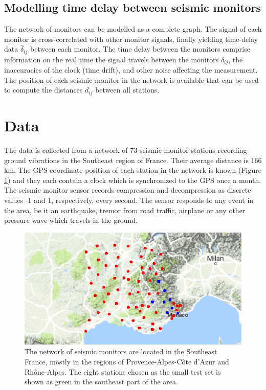 \documentclass[12pt,a4paper,english]{article}
\begin{document}
\subsection{Modelling time delay between seismic monitors}
The network of monitors can be modelled as a complete graph. The signal of each monitor is cross-correlated with other monitor signals, finally yielding time-delay data $\hat{\delta}_{ij}$ between each monitor. The time delay between the monitors comprise information on the real time the signal travels between the monitors $\delta_{ij}$, the inaccuracies of the clock (time drift), and other noise affecting the measurement. The position of each seismic monitor in the network is available that can be used to compute the distances $d_{ij}$ between all stations.

\section{Data}

The data is collected from a network of 73 seismic monitor stations recording ground vibrations in the Southeast region of France. Their average distance is $166$km. The GPS coordinate position of each station in the network is known (Figure \ref{fig:monitornetwork}) and they each contain a clock which is synchronized to the GPS once a month. The seismic monitor sensor records compression and decompression as discrete values -1 and 1, respectively, every second. The sensor responds to any event in the area, be it an earthquake, tremor from road traffic, airplane or any other pressure wave which travels in the ground.

\begin{figure}[ht]
  \begin{center}   
   \includegraphics[width=\textwidth]{TestStations_zoom.png}
  \end{center}
  \caption{The network of seismic monitors are located in the Southeast France, mostly in the regions of Provence-Alpes-C\^{o}te d'Azur and Rh\^{o}ne-Alpes. The eight stations chosen as the small test set is shown as green in the southeast part of the area.}\label{fig:monitornetwork}
\end{figure}
\end{document}
